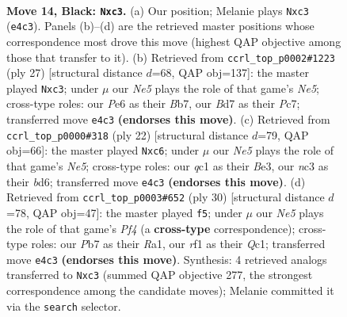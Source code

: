 \documentclass[11pt]{article}
\begin{document}
\begin{figure}[p]
\label{fig:thought-m25}
\end{figure}

\clearpage

\begin{figure}[p]\centering
\begin{subfigure}{0.46\textwidth}\centering
\resizebox{\linewidth}{!}{%
\newchessgame
\chessboard[
  setfen={r3r1k1/1p1bqppp/p1n1p3/2Pp4/3Pn3/P1N2N1P/1P2BPP1/R1Q2RK1 b - - 1 14},
  showmover=false,
  pgfstyle=straightmove, color=movearrow, markmove={e4-c3}
]}
\caption{}
\end{subfigure}\hfill
\begin{subfigure}{0.46\textwidth}\centering
\resizebox{\linewidth}{!}{%
\newchessgame
\chessboard[
  setfen={r1r3k1/pbpnqpp1/1p5p/3p4/3Pn3/2N1P3/PPQNBPPP/2R2RK1 b - - 3 14},
  showmover=false,
  pgfstyle=straightmove, color=movearrow, markmove={e4-c3}
]}
\caption{}
\end{subfigure}
\\[4pt]
\begin{subfigure}{0.46\textwidth}\centering
\resizebox{\linewidth}{!}{%
\newchessgame
\chessboard[
  setfen={r1bq1rk1/1p3ppp/p1nbpn2/4N3/2BP4/P1N1B3/1P3PPP/R2Q1RK1 w - - 4 12},
  showmover=false,
  pgfstyle=straightmove, color=movearrow, markmove={e5-c6}
]}
\caption{}
\end{subfigure}\hfill
\begin{subfigure}{0.46\textwidth}\centering
\resizebox{\linewidth}{!}{%
\newchessgame
\chessboard[
  setfen={2rq1r2/p1nb1pkp/1pn3p1/2p1p3/5P1N/2NP2PP/PP2P1B1/R1Q2RK1 w - - 0 16},
  showmover=false,
  pgfstyle=straightmove, color=movearrow, markmove={f4-f5}
]}
\caption{}
\end{subfigure}
\caption{\textbf{Move 14, Black: \texttt{Nxc3}.} (a) Our position; Melanie plays \texttt{Nxc3} (\texttt{e4c3}). Panels (b)--(d) are the retrieved master positions whose correspondence most drove this move (highest QAP objective among those that transfer to it). (b) Retrieved from \texttt{ccrl\_top\_p0002\#1223} (ply 27) [structural distance $d$=68, QAP obj=137]: the master played \texttt{Nxc3}; under $\mu$ our \emph{Ne5} plays the role of that game's \emph{Ne5}; cross-type roles: our \emph{P}e6 as their \emph{B}b7, our \emph{B}d7 as their \emph{P}c7; transferred move \texttt{e4c3} \textbf{(endorses this move)}. (c) Retrieved from \texttt{ccrl\_top\_p0000\#318} (ply 22) [structural distance $d$=79, QAP obj=66]: the master played \texttt{Nxc6}; under $\mu$ our \emph{Ne5} plays the role of that game's \emph{Ne5}; cross-type roles: our \emph{q}c1 as their \emph{B}e3, our \emph{n}c3 as their \emph{b}d6; transferred move \texttt{e4c3} \textbf{(endorses this move)}. (d) Retrieved from \texttt{ccrl\_top\_p0003\#652} (ply 30) [structural distance $d$=78, QAP obj=47]: the master played \texttt{f5}; under $\mu$ our \emph{Ne5} plays the role of that game's \emph{Pf4} (a \textbf{cross-type} correspondence); cross-type roles: our \emph{P}b7 as their \emph{R}a1, our \emph{r}f1 as their \emph{Q}c1; transferred move \texttt{e4c3} \textbf{(endorses this move)}. Synthesis: 4 retrieved analogs transferred to \texttt{Nxc3} (summed QAP objective 277, the strongest correspondence among the candidate moves); Melanie committed it via the \texttt{search} selector.}

\end{figure}
\end{document}
